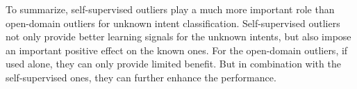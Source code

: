 
To summarize, self-supervised outliers play a much more important role than open-domain outliers for unknown intent classification. Self-supervised outliers not only provide better learning signals for the unknown intents, but also impose an important positive effect on the known ones. For the open-domain outliers, if used alone, they can only provide limited benefit. But in combination with the self-supervised ones, they can further enhance the performance.
\begin{table}[t]
\centering
{}
\caption{\label{table:ablation}
An ablation study on the effectiveness of pseudo outliers.
}
\end{table}



